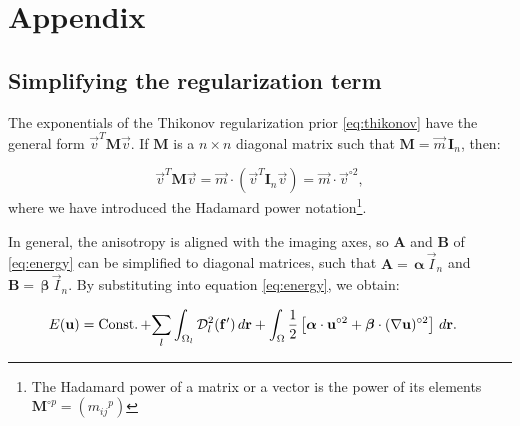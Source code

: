 \renewcommand{\theequation}{A.\arabic{equation}}
\renewcommand{\thesubsection}{Appendix \arabic{subsection}}

\section*{Appendix}

\subsection{Simplifying the regularization term}\label{app:reg_term}
The exponentials of the Thikonov regularization prior \eqref{eq:thikonov} have the general form
  $\vec{v}^T \mathbf{M} \vec{v}$.
If $\mathbf{M}$ is a $n \times n$ diagonal matrix such that $\mathbf{M} = \vec{m} \, \mathbf{I}_n$, 
  then:

\begin{equation*}
\vec{v}^T \mathbf{M} \vec{v} = \vec{m} \cdot (\vec{v}^T \mathbf{I}_n \vec{v}) = \vec{m} \cdot \vec{v}^{\circ2},
\end{equation*}
  where we have introduced the Hadamard power notation\footnote{The Hadamard power of a matrix or a vector
  is the power of its elements $\mathbf{M}^{\circ p} = ({m_{ij}}^{p})$}.

In general, the anisotropy is aligned with the imaging axes, so 
  $\mathbf{A}$ and $\mathbf{B}$ of \eqref{eq:energy} can be simplified to diagonal matrices, such that
  $\mathbf{A}= \, \boldsymbol{\alpha}\,\vec{I}_n$ and
  $\mathbf{B}= \, \boldsymbol{\beta}\,\vec{I}_n$.
By substituting into equation \eqref{eq:energy}, we obtain:

  \begin{align}
  E(\vec{u}) &= \const + \underset{l}{\sum} \int_{\Omega_l} \mdist{f'}{l} \,d\vec{r} +   \int_{\Omega} \frac12 \left[ \boldsymbol{\alpha} \cdot \vec{u}^{\circ2} + \boldsymbol{\beta} \cdot (\nabla \vec{u})^{\circ2} \right] \,d\vec{r}.
  \label{eq:app_energy}
  \end{align} 